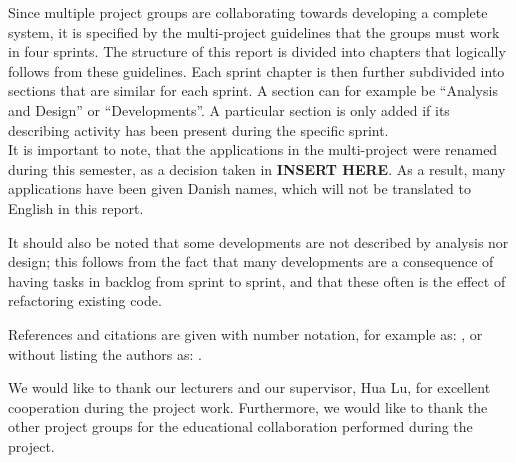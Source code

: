 Since multiple project groups are collaborating towards developing a complete system, it is specified by the multi-project guidelines that the groups must work in four sprints.
The structure of this report is divided into chapters that logically follows from these guidelines.
Each sprint chapter is then further subdivided into sections that are similar for each sprint.
A section can for example be ``Analysis and Design'' or ``Developments''.
A particular section is only added if its describing activity has been present during the specific sprint.\\

It is important to note, that the applications in the multi-project were renamed during this semester, as a decision taken in \textbf{INSERT HERE}.
As a result, many applications have been given Danish names, which will not be translated to English in this report.

It should also be noted that some developments are not described by analysis nor design; this follows from the fact that many developments are a consequence of having tasks in backlog from sprint to sprint, and that these often is the effect of refactoring existing code.

References and citations are given with number notation, for example as: \citet{launcher2011}, or without listing the authors as: \cite{launcher2011}. 

We would like to thank our lecturers and our supervisor, Hua Lu, for excellent cooperation during the project work.
Furthermore, we would like to thank the other project groups for the educational collaboration performed during the project.
